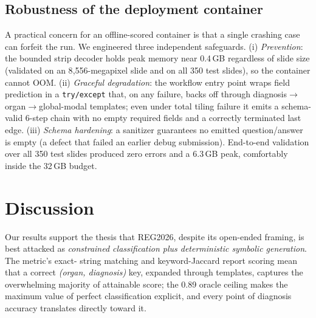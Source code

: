 \documentclass[11pt,a4paper]{article}
\newcommand{\code}[1]{\texttt{\small #1}}
\begin{document}
\subsection{Robustness of the deployment container}
A practical concern for an offline-scored container is that a single crashing case can forfeit the
run. We engineered three independent safeguards. (i) \emph{Prevention}: the bounded strip decoder
holds peak memory near 0.4\,GB regardless of slide size (validated on an 8{,}556-megapixel slide and
on all 350 test slides), so the container cannot OOM. (ii) \emph{Graceful degradation}: the workflow
entry point wraps field prediction in a \code{try/except} that, on any failure, backs off through
diagnosis$\rightarrow$organ$\rightarrow$global-modal templates; even under total tiling failure it
emits a schema-valid 6-step chain with no empty required fields and a correctly terminated last
edge. (iii) \emph{Schema hardening}: a sanitizer guarantees no emitted question/answer is empty
(a defect that failed an earlier debug submission). End-to-end validation over all 350 test slides
produced zero errors and a 6.3\,GB peak, comfortably inside the 32\,GB budget.

\section{Discussion}
\label{sec:discussion}

Our results support the thesis that REG2026, despite its open-ended framing, is best attacked as
\emph{constrained classification plus deterministic symbolic generation}. The metric's exact-
string matching and keyword-Jaccard report scoring mean that a correct \emph{(organ, diagnosis)}
key, expanded through templates, captures the overwhelming majority of attainable score; the
0.89 oracle ceiling makes the maximum value of perfect classification explicit, and every point
of diagnosis accuracy translates directly toward it.
\end{document}
